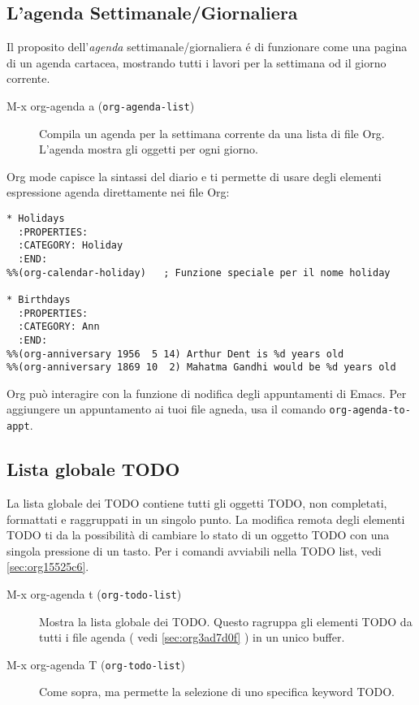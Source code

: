 \documentclass[11pt]{article}
\begin{document}
\subsection[Built-in Agenda Views]{L'agenda Settimanale/Giornaliera}
\label{sec:orgdc310a7}
Il proposito dell'\emph{agenda} settimanale/giornaliera é di funzionare
come una pagina di un agenda cartacea, mostrando tutti i lavori per la
settimana od il giorno corrente.

\begin{description}
\item[{M-x org-agenda a (\texttt{org-agenda-list})}] Compila un agenda per la settimana corrente da una lista di file
Org. L'agenda mostra gli oggetti per ogni giorno.
\end{description}

Org mode capisce la sintassi del diario e ti permette di usare degli
elementi espressione agenda direttamente nei file Org:

\begin{verbatim}
* Holidays
  :PROPERTIES:
  :CATEGORY: Holiday
  :END:
%%(org-calendar-holiday)   ; Funzione speciale per il nome holiday

* Birthdays
  :PROPERTIES:
  :CATEGORY: Ann
  :END:
%%(org-anniversary 1956  5 14) Arthur Dent is %d years old
%%(org-anniversary 1869 10  2) Mahatma Gandhi would be %d years old
\end{verbatim}

Org può interagire con la funzione di nodifica degli appuntamenti di
Emacs. Per aggiungere un appuntamento ai tuoi file agneda, usa il
comando \texttt{org-agenda-to-appt}.

\subsection[Global TODO List]{Lista globale TODO}
\label{sec:org0f74436}
La lista globale dei TODO contiene tutti gli oggetti TODO, non
completati, formattati e raggruppati in un singolo punto. La modifica
remota degli elementi TODO ti da la possibilità di cambiare lo stato
di un oggetto TODO con una singola pressione di un tasto. Per i
comandi avviabili nella TODO list, vedi \ref{sec:org15525c6}.

\begin{description}
\item[{M-x org-agenda t (\texttt{org-todo-list})}] Mostra la lista globale dei TODO. Questo ragruppa gli elementi TODO
da tutti i file agenda ( vedi \ref{sec:org3ad7d0f} ) in un unico
buffer.

\item[{M-x org-agenda T (\texttt{org-todo-list})}] Come sopra, ma permette la selezione di uno specifica keyword TODO.
\end{description}
\end{document}
